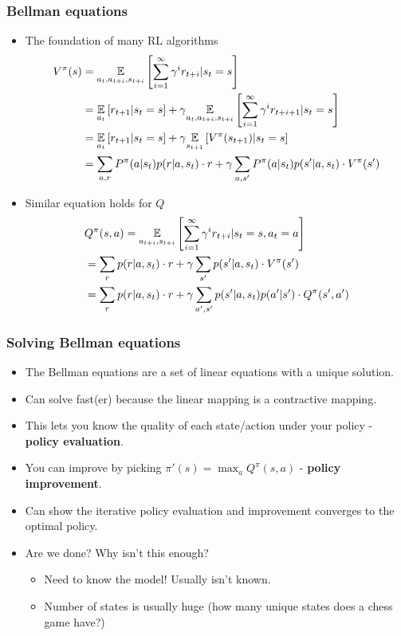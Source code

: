 \documentclass[handout]{beamer}
\renewcommand{\high}{\textbf}
\begin{document}
\begin{frame}\frametitle{Bellman equations}\small
\begin{itemize}
	\item The foundation of many RL algorithms
	{\footnotesize
	\begin{align*}\footnotesize
	V^\pi(s)&=\underset{a_{t},a_{t+i},s_{t+i}}{\mathbb{E}}\left[\sum_{i=1}^\infty\gamma^{i} r_{t+i} |s_t=s\right] \\
	&=\underset{a_{t}}{\mathbb{E}}\left[r_{t+1} |s_t=s\right]  +\gamma \underset{a_{t},a_{t+i},s_{t+i}}{\mathbb{E}}\left[\sum_{i=1}^\infty\gamma^{i} r_{t+i+1} |s_t=s\right] \\
	& = \underset{a_{t}}{\mathbb{E}}\left[r_{t+1} |s_t=s\right] +\gamma \underset{s_{t+1}}{\mathbb{E}}\left[V^{\pi}(s_{t+1})|s_t=s\right] \\
	& = \sum_{a,r}P^{\pi}(a|s_t)p(r|a,s_t)\cdot r+\gamma \sum_{a,s'}P^{\pi}(a|s_t)p(s'|a,s_t)\cdot V^{\pi}(s')
	\end{align*}}
	\item Similar equation holds for $Q$
		{\footnotesize
		\begin{align*}\footnotesize
		&Q^\pi(s,a)=\underset{a_{t+i},s_{t+i}}{\mathbb{E}}\left[\sum_{i=1}^\infty\gamma^{i} r_{t+i} |s_t=s,a_t=a\right] \\
		& = \sum_{r}p(r|a,s_t)\cdot r+ \gamma\sum_{s'}p(s'|a,s_t)\cdot V^{\pi}(s') \\
		&=\sum_{r}p(r|a,s_t)\cdot r+ \gamma\sum_{a',s'}p(s'|a,s_t)p(a'|s')\cdot Q^{\pi}(s',a')
		\end{align*}}
\end{itemize}
\end{frame}

\begin{frame}\frametitle{Solving Bellman equations}\small
\begin{itemize}
	\item The Bellman equations are a set of linear equations with a unique solution.
	\onslide<2->\item Can solve fast(er) because the linear mapping is a contractive mapping.
	\onslide<3->\item This lets you know the quality of each state/action under your policy - \high{policy evaluation}.
	\onslide<4->\item You can improve by picking $\pi'(s)=\max_a Q^{\pi}(s,a)$ - \high{policy improvement}.
	\onslide<5->\item Can show the iterative policy evaluation and improvement converges to the optimal policy.
	\onslide<6->\item Are we done? \onslide<7-> Why isn't this enough?
	\onslide<8->
	\begin{itemize}
		\item Need to know the model! Usually isn't known.
		\item Number of states is usually huge (how many unique states does a chess game have?) 
	\end{itemize}
\end{itemize}
\end{frame}
\end{document}
